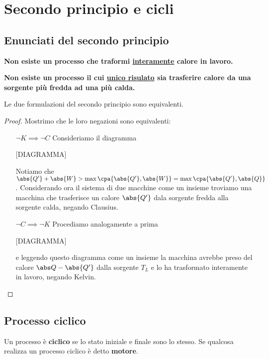 \section{Secondo principio e cicli}
\subsection{Enunciati del secondo principio}
\begin{fact}
\textbf{Non esiste un processo che traformi \ul{interamente} calore in lavoro.}
\end{fact}

\begin{fact}
\textbf{Non esiste un processo il cui \ul{unico risulato} sia trasferire calore da una sorgente pi\`u fredda ad una pi\`u calda.}
\end{fact}

\begin{proposition}
Le due formulazioni del secondo principio sono equivalenti.
\end{proposition}
\begin{proof}
Mostrimo che le loro negazioni sono equivalenti:
\setlength{\leftmargini}{0cm}
\begin{itemize}
\item[$\boxed{\neg K\implies \neg C}$] Consideriamo il diagramma

[DIAGRAMMA]

Notiamo che $\abs{Q'}+\abs{W}>\max{\cpa{\abs{Q'},\abs{W}}}=\max{\cpa{\abs{Q'},\abs{Q}}}$. Considerando ora il sistema di due macchine come un insieme troviamo una macchina che trasferisce un calore $\abs{Q'}$ dala sorgente fredda alla sorgente calda, negando Clausius.
\item[$\boxed{\neg C\implies \neg K}$] Procediamo analogamente a prima

[DIAGRAMMA]

e leggendo questo diagramma come un insieme la macchina avrebbe preso del calore $\abs Q-\abs{Q'}$ dalla sorgente $T_L$ e lo ha trasformato interamente in lavoro, negando Kelvin.
\end{itemize}
\setlength{\leftmargini}{0.5cm}
\end{proof}

\subsection{Processo ciclico}
\begin{definition}
Un processo \`e \textbf{ciclico} se lo stato iniziale e finale sono lo stesso. Se qualcosa realizza un processo ciclico \`e detto \textbf{motore}.
\end{definition}


